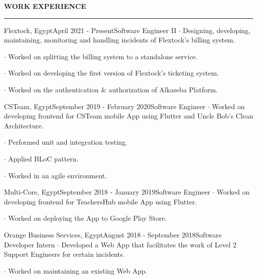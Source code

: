 \noindent\textcolor{themecolor}{\textbf{WORK EXPERIENCE}}

\vspace{2mm}
\hrule
\vspace{3mm}

\begin{verbose}{Flextock, Egypt}{April 2021 - Present}{Software Engineer II}
    \noindent $\cdot$ Designing, developing, maintaining, monitoring and handling incidents of Flextock's billing system.

    \noindent $\cdot$ Worked on splitting the billing system to a standalone service.

    \noindent $\cdot$ Worked on developing the first version of Flextock's ticketing system.

    \noindent $\cdot$ Worked on the authentication \& authorization of Alkaseba Platform.
\end{verbose}

\vspace{3mm}

\begin{verbose}{CSTeam, Egypt}{September 2019 - February 2020}{Software Engineer}
    \noindent $\cdot$ Worked on developing frontend for CSTeam mobile App using Flutter and Uncle Bob's Clean Architecture.

    \noindent $\cdot$ Performed unit and integration testing.
    
    \noindent $\cdot$ Applied BLoC pattern.
    
    \noindent $\cdot$ Worked in an agile environment.
\end{verbose}

\vspace{3mm}

\begin{verbose}{Multi-Core, Egypt}{September 2018 - January 2019}{Software Engineer}
    \noindent $\cdot$ Worked on developing frontend for TeachersHub mobile App using Flutter.

    \noindent $\cdot$ Worked on deploying the App to Google Play Store.
\end{verbose}

\vspace{3mm}

\begin{verbose}{Orange Business Services, Egypt}{August 2018 - September 2018}{Software Developer Intern}
    \noindent $\cdot$ Developed a Web App that facilitates the work of Level 2 Support Engineers for certain incidents.

    \noindent $\cdot$ Worked on maintaining an existing Web App.
\end{verbose}

